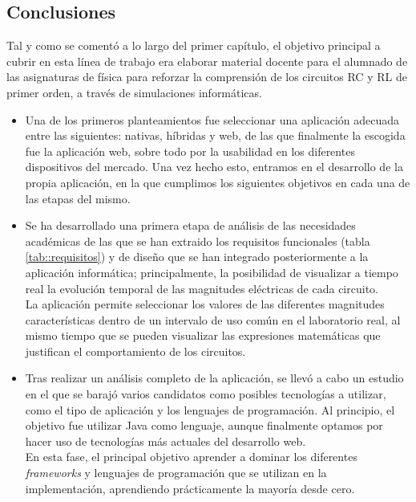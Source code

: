 \documentclass[../main.tex]{subfiles}
\begin{document}
\subsection{Conclusiones}
Tal y como se comentó a lo largo del primer capítulo, el objetivo principal a cubrir en esta línea de trabajo era elaborar material docente para el alumnado de las asignaturas de física para reforzar la comprensión de los circuitos RC y RL de primer orden, a través de simulaciones informáticas.\\ 





\begin{itemize}

    \item Una de los primeros planteamientos fue seleccionar una aplicación adecuada entre las siguientes: nativas, híbridas y web, de las que finalmente la escogida fue la aplicación web, sobre todo por la usabilidad en los diferentes dispositivos del mercado. Una vez hecho esto, entramos en el desarrollo de la propia aplicación, en la que cumplimos los siguientes objetivos en cada una de las etapas del mismo.

    \item Se ha desarrollado una primera etapa de análisis de las necesidades académicas de las que se han extraido los requisitos funcionales (tabla \ref{tab::requisitos}) y de diseño que se han integrado posteriormente a la aplicación informática; principalmente, la posibilidad de visualizar a tiempo real la evolución temporal de las magnitudes eléctricas de cada circuito.\\ 
    
    La aplicación permite seleccionar los valores de las diferentes magnitudes características dentro de un intervalo de uso común en el laboratorio real, al mismo tiempo que se pueden visualizar las expresiones matemáticas que justifican el comportamiento de los circuitos.  

    \item Tras realizar un análisis completo de la aplicación, se llevó a cabo un estudio en el que se barajó varios candidatos como posibles tecnologías a utilizar, como el tipo de aplicación y los lenguajes de programación. Al principio, el objetivo fue utilizar Java como lenguaje, aunque finalmente optamos por hacer uso de tecnologías más actuales del desarrollo web.\\ 
    
    En esta fase, el principal objetivo aprender a dominar los diferentes \textit{frameworks} y lenguajes de programación que se utilizan en la implementación, aprendiendo prácticamente la mayoría desde cero.
    

\end{itemize}
\end{document}

